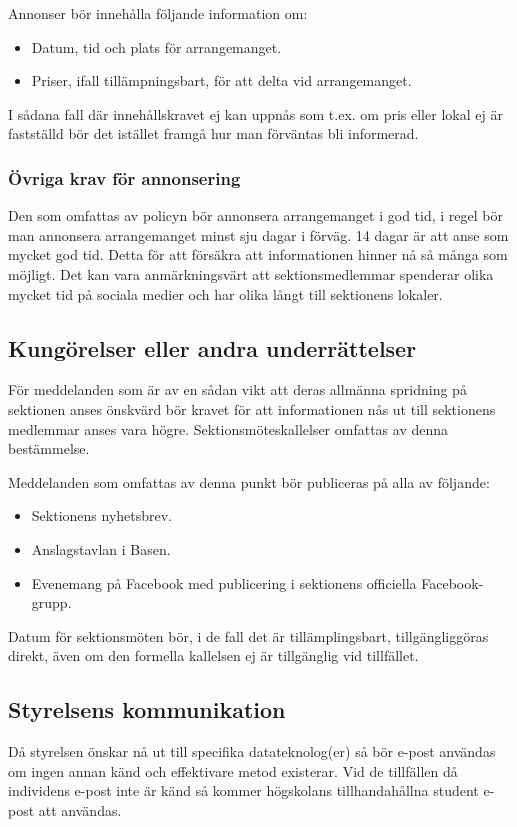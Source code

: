 Annonser bör innehålla följande information om:
\begin{itemize}
    \item Datum, tid och plats för arrangemanget.
    \item Priser, ifall tillämpningsbart, för att delta vid arrangemanget.
\end{itemize}
I sådana fall där innehållskravet ej kan uppnås som t.ex. om pris eller lokal ej är fastställd
bör det istället framgå hur man förväntas bli informerad.

\subsubsection{Övriga krav för annonsering}
Den som omfattas av policyn bör annonsera arrangemanget i god tid, i regel bör man
annonsera arrangemanget minst sju dagar i förväg. 14 dagar är att anse som mycket god
tid. Detta för att försäkra att informationen hinner nå så många som möjligt. Det kan vara
anmärkningsvärt att sektionsmedlemmar spenderar olika mycket tid på sociala medier och
har olika långt till sektionens lokaler.

\subsection{Kungörelser eller andra underrättelser}
För meddelanden som är av en sådan vikt att deras allmänna spridning på sektionen anses
önskvärd bör kravet för att informationen nås ut till sektionens medlemmar anses vara
högre. Sektionsmöteskallelser omfattas av denna bestämmelse.

Meddelanden som omfattas av denna punkt bör publiceras på alla av följande:
\begin{itemize}
    \item Sektionens nyhetsbrev.
    \item Anslagstavlan i Basen.
    \item Evenemang på Facebook med publicering i sektionens officiella Facebook-grupp.
\end{itemize}
Datum för sektionsmöten bör, i de fall det är tillämplingsbart, tillgängliggöras direkt, även
om den formella kallelsen ej är tillgänglig vid tillfället.

\subsection{Styrelsens kommunikation}
Då styrelsen önskar nå ut till specifika datateknolog(er) så bör e-post användas om ingen
annan känd och effektivare metod existerar. Vid de tillfällen då individens e-post inte är
känd så kommer högskolans tillhandahållna student e-post att användas.

